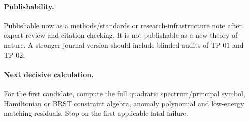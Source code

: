 \documentclass[11pt,a4paper]{article}
\begin{document}
\paragraph{Publishability.} Publishable now as a methods/standards or research-infrastructure note after expert review and citation checking. It is not publishable as a new theory of nature. A stronger journal version should include blinded audits of TP-01 and TP-02.

\paragraph{Next decisive calculation.} For the first candidate, compute the full quadratic spectrum/principal symbol, Hamiltonian or BRST constraint algebra, anomaly polynomial and low-energy matching residuals. Stop on the first applicable fatal failure.

\appendix


\printbibliography
\end{document}
